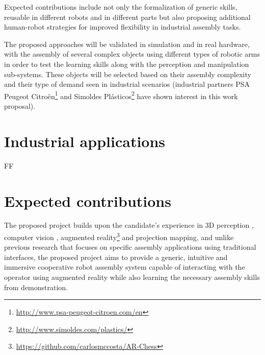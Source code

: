 Expected contributions include not only the formalization of generic skills, reusable in different robots and in different parts but also proposing additional human-robot strategies for improved flexibility in industrial assembly tasks.

The proposed approaches will be validated in simulation and in real hardware, with the assembly of several complex objects using different types of robotic arms in order to test the learning skills along with the perception and manipulation sub-systems. These objects will be selected based on their assembly complexity and their type of demand seen in industrial scenarios (industrial partners PSA Peugeot Citroën\footnote{\url{http://www.psa-peugeot-citroen.com/en}} and Simoldes Plásticos\footnote{\url{http://www.simoldes.com/plastics/}} have shown interest in this work proposal).



\section{Industrial applications}

FF



\section{Expected contributions}

The proposed project builds upon the candidate’s experience in 3D perception \cite{Costa2015Diss,Costa2015ICIT,Costa2015Intech,Costa2016Elsevier}, computer vision \cite{Costa2014,Costa2016ICARSC}, augmented reality\footnote{\url{https://github.com/carlosmccosta/AR-Chess}} and projection mapping, and unlike previous research that focuses on specific assembly applications using traditional interfaces, the proposed project aims to provide a generic, intuitive and immersive cooperative robot assembly system capable of interacting with the operator using augmented reality while also learning the necessary assembly skills from demonstration.
